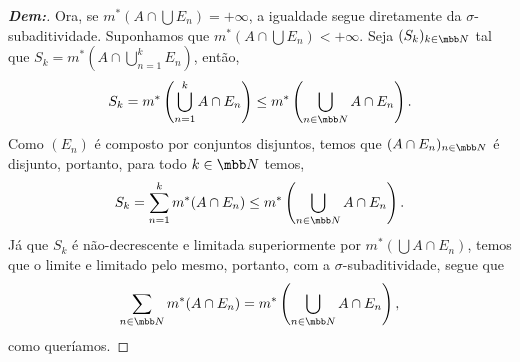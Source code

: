 \begin{proof}[\textbf{Dem:}]
  Ora, se $m^*(A \cap \bigcup E_n) = +\infty$, a igualdade segue diretamente da $\sigma$-subaditividade. Suponhamos 
  que $m^*(A \cap \bigcup E_n) < +\infty$. Seja $(S_k)_{k \in \mbb N}$ tal que $S_k = m^*(A\cap \bigcup_{n=1}^k E_n)$,
  então,
  \begin{align*}
    S_k = m^*\left(\bigcup_{n=1}^k A \cap E_n\right) \le m^*\left(\bigcup_{n \in \mbb N} A\cap E_n\right).
  \end{align*}
  Como $(E_n)$ é composto por conjuntos disjuntos, 
  temos que $(A \cap E_n)_{n \in \mbb N}$ é disjunto, portanto, para todo $k \in \mbb N$ temos,
  \begin{align*}
    S_k = \sum_{n = 1}^k m^*(A \cap E_n) \le m^*\left(\bigcup_{n \in \mbb N} A\cap E_n\right).
  \end{align*}
  Já que $S_k$ é não-decrescente e limitada superiormente por $m^*(\bigcup A\cap E_n)$, temos que 
  o limite e limitado pelo mesmo, portanto, com a $\sigma$-subaditividade, segue que
  \begin{align*}
    \sum_{n \in \mbb N} m^*(A\cap E_n) =  m^*\left(\bigcup_{n \in \mbb N} A\cap E_n\right),
  \end{align*}
  como queríamos.
\end{proof}
\biglinend
\newpage
{}
\myexe{\thedois}
\bigline 
